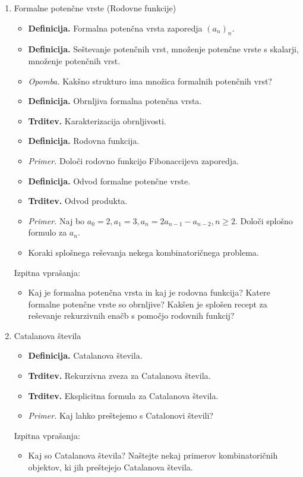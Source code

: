 \begin{enumerate}
    \item Formalne potenčne vrste (Rodovne funkcije)
    \begin{itemize}
        \item \colorbox{purple!30}{\textbf{Definicija.}} Formalna potenčna vrsta zaporedja \((a_n)_n\).
        \item \colorbox{purple!30}{\textbf{Definicija.}} Seštevanje potenčnih vrst, množenje potenčne vrste s skalarji, množenje potenčnih vrst.
        \item \colorbox{yellow!30}{\emph{Opomba.}} Kakšno strukturo ima množica formalnih potenčnih vrst?
        \item \colorbox{purple!30}{\textbf{Definicija.}} Obrnljiva formalna potenčna vrsta.
        \item \colorbox{blue!30}{\textbf{Trditev.}} Karakterizacija obrnljivosti.
        \item \colorbox{purple!30}{\textbf{Definicija.}} Rodovna funkcija.
        \item \colorbox{yellow!30}{\emph{Primer.}} Določi rodovno funkcijo Fibonaccijeva zaporedja.
        \item \colorbox{purple!30}{\textbf{Definicija.}} Odvod formalne potenčne vrste.
        \item \colorbox{blue!30}{\textbf{Trditev.}} Odvod produkta.
        \item \colorbox{yellow!30}{\emph{Primer.}} Naj bo $a_0 = 2, a_1 = 3, a_n = 2a_{n-1}-a_{n-2}, n \geq 2$. Določi splošno formulo za $a_n$.
        \item Koraki splošnega reševanja nekega kombinatoričnega problema.
    \end{itemize}

    Izpitna vprašanja:
    \begin{itemize}
        \item Kaj je formalna potenčna vrsta in kaj je rodovna funkcija? Katere formalne potenčne vrste so obrnljive? Kakšen je splošen recept za reševanje rekurzivnih enačb s pomočjo rodovnih funkcij?
    \end{itemize}

    \item Catalanova števila
    \begin{itemize}
        \item \colorbox{purple!30}{\textbf{Definicija.}} Catalanova števila.
        \item \colorbox{blue!30}{\textbf{Trditev.}} Rekurzivna zveza za Catalanova števila.
        \item \colorbox{blue!30}{\textbf{Trditev.}} Eksplicitna formula za Catalanova števila.
        \item \colorbox{yellow!30}{\emph{Primer.}} Kaj lahko preštejemo s Catalonovi števili?
    \end{itemize}

    Izpitna vprašanja:
    \begin{itemize}
        \item Kaj so Catalanova števila? Naštejte nekaj primerov kombinatoričnih objektov, ki jih preštejejo Catalanova števila.
    \end{itemize}
\end{enumerate}


